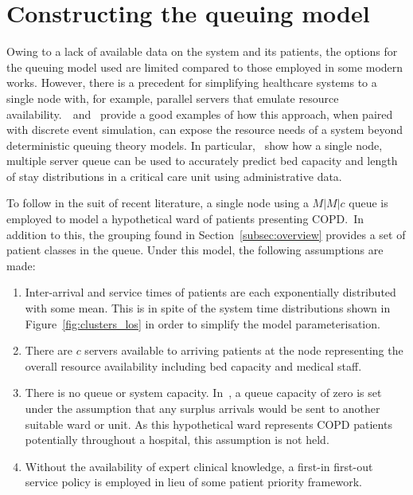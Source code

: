 \section{Constructing the queuing model}\label{sec:model}


Owing to a lack of available data on the system and its patients, the options
for the queuing model used are limited compared to those employed in some modern
works. However, there is a precedent for simplifying healthcare systems to a
single node with, for example, parallel servers that emulate resource
availability.~\cite{Steins2013}~and~\cite{Williams2015} provide a good examples
of how this approach, when paired with discrete event simulation, can expose the
resource needs of a system beyond deterministic queuing theory models. In
particular,~\citeauthor{Williams2015} show how a single node, multiple server
queue can be used to accurately predict bed capacity and length of stay
distributions in a critical care unit using administrative data.

To follow in the suit of recent literature, a single node using a \(M|M|c\)
queue is employed to model a hypothetical ward of patients presenting COPD.\ In
addition to this, the grouping found in Section~\ref{subsec:overview} provides
a set of patient classes in the queue. Under this model, the following
assumptions are made:
\begin{enumerate}
    \item Inter-arrival and service times of patients are each exponentially
        distributed with some mean. This is in spite of the system time
        distributions shown in Figure~\ref{fig:clusters_los} in order to
        simplify the model parameterisation.
    \item There are $c$ servers available to arriving patients at the node
        representing the overall resource availability including bed capacity
        and medical staff.
    \item There is no queue or system capacity. In~\cite{Williams2015}, a
        queue capacity of zero is set under the assumption that any surplus
        arrivals would be sent to another suitable ward or unit. As this
        hypothetical ward represents COPD patients potentially throughout a
        hospital, this assumption is not held.
    \item Without the availability of expert clinical knowledge, a first-in
        first-out service policy is employed in lieu of some patient priority 
        framework.
\end{enumerate}

